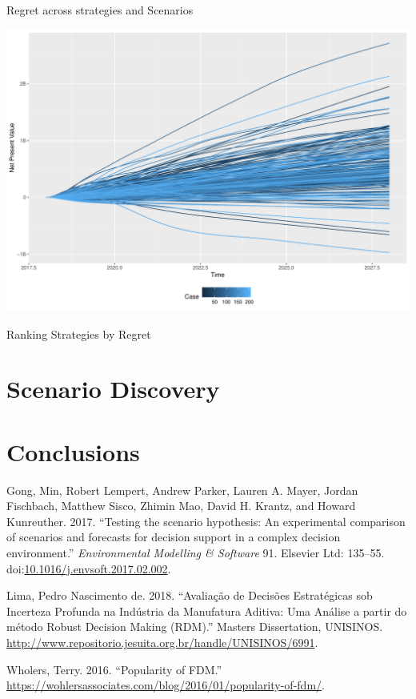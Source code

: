 \documentclass[12pt,ignorenonframetext,]{beamer}
\begin{document}
\begin{frame}{Regret across strategies and Scenarios}

\begin{center}\includegraphics{dmdu-presentation_files/figure-beamer/unnamed-chunk-5-1} \end{center}

\end{frame}

\begin{frame}{Ranking Strategies by Regret}

\end{frame}

\section{Scenario Discovery}\label{scenario-discovery}

\section*{Conclusions}\label{conclusions}

\hypertarget{refs}{}
\hypertarget{ref-Gong2017}{}
Gong, Min, Robert Lempert, Andrew Parker, Lauren A. Mayer, Jordan
Fischbach, Matthew Sisco, Zhimin Mao, David H. Krantz, and Howard
Kunreuther. 2017. ``Testing the scenario hypothesis: An experimental
comparison of scenarios and forecasts for decision support in a complex
decision environment.'' \emph{Environmental Modelling \& Software} 91.
Elsevier Ltd: 135--55.
doi:\href{https://doi.org/10.1016/j.envsoft.2017.02.002}{10.1016/j.envsoft.2017.02.002}.

\hypertarget{ref-Lima2018}{}
Lima, Pedro Nascimento de. 2018. ``Avaliação de Decisões Estratégicas
sob Incerteza Profunda na Indústria da Manufatura Aditiva: Uma Análise a
partir do método Robust Decision Making (RDM).'' Masters Dissertation,
UNISINOS.
\url{http://www.repositorio.jesuita.org.br/handle/UNISINOS/6991}.

\hypertarget{ref-Wholers2016}{}
Wholers, Terry. 2016. ``Popularity of FDM.''
\url{https://wohlersassociates.com/blog/2016/01/popularity-of-fdm/}.
\end{document}

